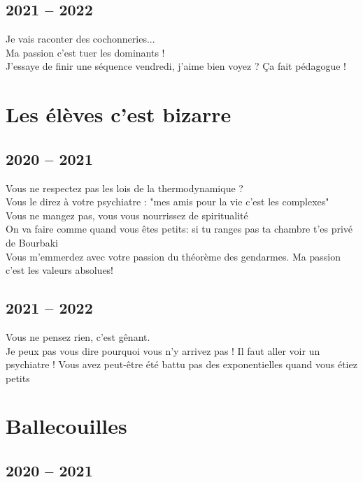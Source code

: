 \documentclass[french, a4paper, openany]{book}
\begin{document}
\section{2021 -- 2022}

	\noindent \og Je vais raconter des cochonneries... \fg \\
	\og Ma passion c'est tuer les dominants ! \fg \\
	\og J'essaye de finir une séquence vendredi, j'aime bien voyez ? Ça fait pédagogue ! \fg \\

\chapter{Les élèves c'est bizarre}

\section{2020 -- 2021}

	\noindent \og Vous ne respectez pas les lois de la thermodynamique ? \fg \\
	\og Vous le direz à votre psychiatre : "mes amis pour la vie c'est les complexes" \fg \\
	\og Vous ne mangez pas, vous vous nourrissez de spiritualité \fg \\
	\og On va faire comme quand vous êtes petits: si tu ranges pas ta chambre t'es privé de Bourbaki \fg \\
	\og Vous m'emmerdez avec votre passion du théorème des gendarmes. Ma passion c'est les valeurs absolues! \fg \\

\section{2021 -- 2022}

	\noindent \og Vous ne pensez rien, c'est gênant. \fg \\
	\og Je peux pas vous dire pourquoi vous n'y arrivez pas ! Il faut aller voir un psychiatre ! Vous avez peut-être été battu pas des exponentielles quand vous étiez petits \fg \\
 
\chapter{Ballecouilles}

\section{2020 -- 2021}
 
\end{document}
